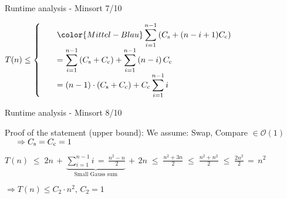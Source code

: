 \begin{frame}{Runtime analysis - Minsort 7/10}
  \begin{center}
    \begin{math}
      T(n) \leq
      \left\lbrace
      \begin{array}{l}
      \displaystyle\hspace*{1.5em}\color{Mittel-Blau}
        \sum^{n - 1}_{i = 1} \left(C_\text{s} + (n - i + 1) C_\text{c}\right)\\
      \displaystyle\hspace*{1.5em}
        = \sum^{n - 1}_{i = 1} \left(C_\text{s} + C_\text{c}\right)
        + \sum^{n - 1}_{i = 1} \left(n - i\right) C_\text{c}\\
      \displaystyle\hspace{1.5em}
        = \left(n - 1\right) \cdot \left(C_\text{s} + C_\text{c}\right)
        + C_\text{c} \sum_{i = 1}^{n - 1} i\\
      \end{array}
      \right.
    \end{math}
  \end{center}
\end{frame}


\begin{frame}{Runtime analysis - Minsort 8/10}
  \begin{block}{Proof of the statement ({\color{Mittel-Gruen}upper bound}):}
    We assume: Swap, Compare $\in \mathcal{O}(1)$\\
    $\hspace{1.5em}\Rightarrow C_\text{s} = C_\text{c} = 1$
    \vspace*{0.5em}
    \begin{center}
      $\displaystyle
      T(n)
      \;\leq\;
        2 n \, + \, \underbrace{
          \sum \limits^{n - 1}_{i = 1} i
          \,=\, \frac{n^2 - n}{2}
        }_\text{Small Gauss sum}
        \, + \,2  n
      \;\leq\; \frac{n^2 + 3 n}{2}
      \;\leq\; \frac{n^2 + n^2}{2}
      \;\leq\; \frac{2 n^2}{2}
      \,=\, n^2
      $
    \end{center}
    $\Rightarrow T(n) \leq C_2 \cdot n^2, \, C_2 = 1$
  \end{block}
\end{frame}

